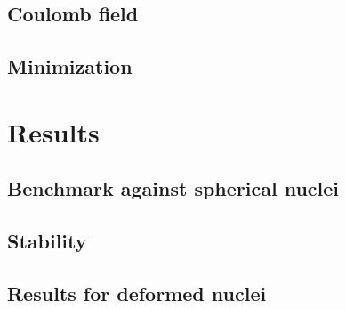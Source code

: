 \documentclass{book}
\begin{document}
\section{Coulomb field}
\section{Minimization}

\chapter{Results}
\section{Benchmark against spherical nuclei} 
\section{Stability}
\section{Results for deformed nuclei}
\end{document}
